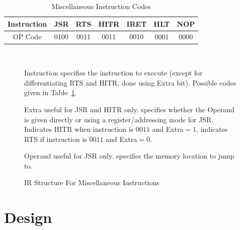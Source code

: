 \documentclass[12pt]{article}
\theoremstyle{plain}
\theoremstyle{definition}
\begin{document}
    \begin{table}[H]
        \centering
        \begin{tabular}{|c|c|c|c|c|c|c|}
            \hline
            Instruction & JSR  & RTS  & HITR  & IRET  & HLT  & NOP  \\ \hline
            OP Code     & 0100 & 0011 & 0011 & 0010 & 0001 & 0000 \\ \hline
        \end{tabular}
        \caption{Miscellaneous Instruction Codes}
        \label{misc-op-codes}
    \end{table}
    \begin{figure}[H]
        \centering
        \caption{IR Structure For Miscellaneous Instructions}
        \label{IR-Misc}
        \vspace{0.5 cm}
         \\
        \vspace{0.5 cm}
        \begin{regdesc}\begin{reglist}            
            \item [Instruction] specifies the instruction to execute (except for differentiating RTS and HITR, done using Extra bit). Possible codes given in Table~\ref{misc-op-codes}.
            \item [Extra] useful for JSR and HITR only. specifies whether the Operand is given directly or using a register/addressing mode for JSR. Indicates HITR when instruction is $0011$ and Extra$=1$, indicates RTS if instruction is $0011$ and Extra$=0$. 
            \item [Operand] useful for JSR only. specifies the memory location to jump  to.
        \end{reglist}\end{regdesc}
    \end{figure}
\pagebreak

\section{Design}
\end{document}
